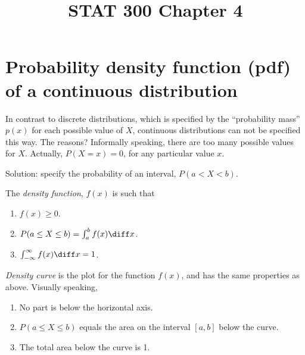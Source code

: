 \documentclass[12pt]{article}
\begin{document}
\title{STAT 300 Chapter 4}
\maketitle



\section{Probability density function (pdf) of a continuous distribution}

In contrast to discrete distributions,
which is specified by the ``probability mass'' $p(x)$ for each possible value
of $X$, continuous distributions can not be specified this way.
The reasons?
Informally speaking, there are too many possible values for $X$.
Actually, $P(X = x) = 0$, for any particular value $x$.

Solution: specify the probability of an interval, $P(a < X < b)$.

The \emph{density function}, $f(x)$ is such that
\begin{enumerate}
\item $f(x) \ge 0$.
\item $P(a \le X \le b) = \int_a^b f(x) \diff x$.
\item $\int_{-\infty}^{\infty} f(x) \diff x = 1$.
\end{enumerate}


\emph{Density curve} is the plot for the function $f(x)$,
and has the same properties as above. Visually speaking,
\begin{enumerate}
\item No part is below the horizontal axis.
\item $P(a \le X \le b)$ equals the area on the interval $[a,b]$ below the
curve.
\item The total area below the curve is 1.
\end{enumerate}
\end{document}
